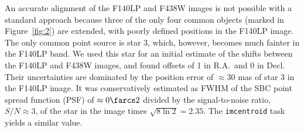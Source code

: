 \documentclass[pdftex,twocolumn]{aastex62}
\newcommand{\gp}[1]{{\color{blue} #1}}
\begin{document}
 An accurate alignment of the F140LP and F438W images is not possible with a standard approach because 
three of the only four common objects (marked in Figure~\ref{fig:2}) are extended, with poorly defined positions in the F140LP image. 
The only common point source is star 3, which, however, becomes much fainter in the F140LP band. We used this star 
for an initial estimate of the shifts between the F140LP and F438W images, and found offsets of 1  in R.A.\ and 0 in Decl.
Their uncertainties  are dominated by the  position error of $\approx$30 mas of star 3 in 
the F140LP image. It was conservatively        
estimated  \citep[see, e.g,][]{1995ApJSNeuschaefer}    %
 as FWHM of the SBC point spread function (PSF)   
of $\approx 0\farcs2$ \citep{Avila2016} divided by the signal-to-noise ratio, $S/N\approx 3$, of the star 
in the  image times $\sqrt{8\ln 2} = 2.35$. The {\tt imcentroid} task yields  a similar value.
\end{document}
